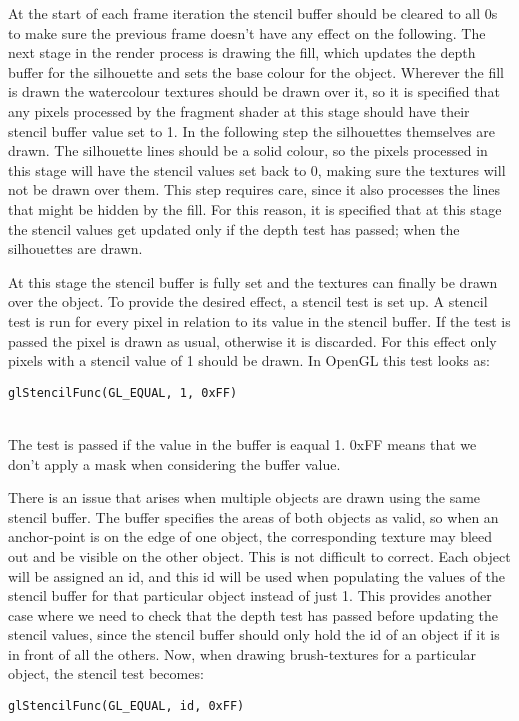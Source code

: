 \documentclass[a4paper, 12pt]{article}
\begin{document}
At the start of each frame iteration the stencil buffer should be cleared to all 0s to make sure the previous frame doesn't have any effect on the following. The next stage in the render process is drawing the fill, which updates the depth buffer for the silhouette and sets the base colour for the object. Wherever the fill is drawn the watercolour textures should be drawn over it, so it is specified that any pixels processed by the fragment shader at this stage should have their stencil buffer value set to 1. In the following step the silhouettes themselves are drawn. The silhouette lines should be a solid colour, so the pixels processed in this stage will have the stencil values set back to 0, making sure the textures will not be drawn over them. This step requires care, since it also processes the lines that might be hidden by the fill. For this reason, it is specified that at this stage the stencil values get updated only if the depth test has passed; when the silhouettes are drawn.

At this stage the stencil buffer is fully set and the textures can finally be drawn over the object. To provide the desired effect, a stencil test is set up. A stencil test is run for every pixel in relation to its value in the stencil buffer. If the test is passed the pixel is drawn as usual, otherwise it is discarded. For this effect only pixels with a stencil value of 1 should be drawn. In OpenGL this test looks as:\\
\centerline{\texttt{glStencilFunc(GL\_EQUAL, 1, 0xFF)\;}}\\
The test is passed if the value in the buffer is eaqual 1. 0xFF means that we don't apply a mask when considering the buffer value.

There is an issue that arises when multiple objects are drawn using the same stencil buffer. The buffer specifies the areas of both objects as valid, so when an anchor-point is on the edge of one object, the corresponding texture may bleed out and be visible on the other object. This is not difficult to correct. Each object will be assigned an id, and this id will be used when populating the values of the stencil buffer for that particular object instead of just 1. This provides another case where we need to check that the depth test has passed before updating the stencil values, since the stencil buffer should only hold the id of an object if it is in front of all the others. Now, when drawing brush-textures for a particular object, the stencil test becomes:\\
\centerline{\texttt{glStencilFunc(GL\_EQUAL, id, 0xFF)\;}}\\
\end{document}
